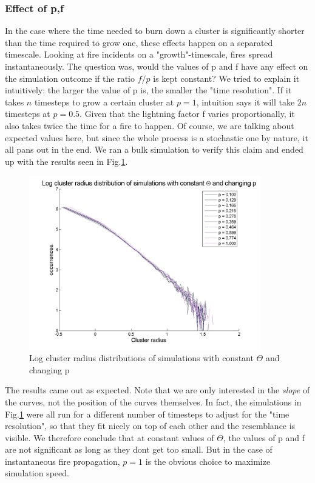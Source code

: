 \documentclass[11pt]{article}
\begin{document}
\subsubsection{Effect of p,f}
In the case where the time needed to burn down a cluster is significantly shorter than the time required to grow one, these effects happen on a separated timescale. Looking at fire incidents on a "growth"-timescale, fires spread instantaneously. The question was, would the values of p and f have any effect on the simulation outcome if the ratio $f/p$ is kept constant? 
We tried to explain it intuitively: the larger the value of p is, the smaller the "time resolution". If it takes $n$ timesteps to grow a certain cluster at $p=1$, intuition says it will take $2n$ timesteps at $p=0.5$. Given that the lightning factor f varies proportionally, it also takes twice the time for a fire to happen. Of course, we are talking about expected values here, but since the whole process is a stochastic one by nature, it all pans out in the end. We ran a bulk simulation to verify this claim and ended up with the results seen in Fig.\ref{varpctheta}.
\begin{figure}[H]
\includegraphics[width= 0.9\textwidth,keepaspectratio=true]{Pictures/varpconsttheta.jpg}
\caption{Log cluster radius distributions of simulations with constant $\Theta$ and changing p}
\label{varpctheta}
\end{figure}
The results came out as expected. Note that we are only interested in the \emph{slope} of the curves, not the position of the curves themselves. In fact, the simulations in Fig.\ref{varpctheta} were all run for a different number of timesteps to adjust for the "time resolution", so that they fit nicely on top of each other and the resemblance is visible. We therefore conclude that at constant values of $\Theta$, the values of p and f are not significant as long as they dont get too small. But in the case of instantaneous fire propagation, $p=1$ is the obvious choice to maximize simulation speed.
\end{document}
